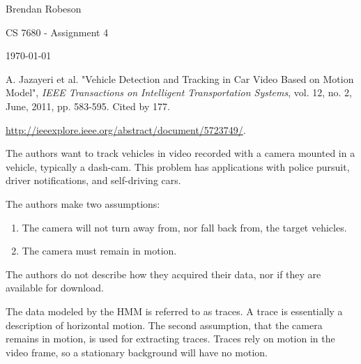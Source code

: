 \documentclass[11pt]{article}
\begin{document}
\noindent Brendan Robeson

\noindent CS 7680 - Assignment 4

\noindent \today

\medskip

\begin{description}[leftmargin=0in]
    \item [Source] A. Jazayeri et al. "Vehicle Detection and Tracking in Car Video Based on Motion
        Model", \emph{IEEE Transactions on Intelligent Transportation Systems}, vol. 12, no. 2,
        June, 2011, pp. 583-595. Cited by 177.

    \item [URL]
        \url{http://ieeexplore.ieee.org/abstract/document/5723749/}.

    \item [Problem] The authors want to track vehicles in video recorded with a camera mounted in a
        vehicle, typically a dash-cam. This problem has applications with police pursuit, driver
        notifications, and self-driving cars.

    \item [Assumptions] The authors make two assumptions:
        \begin{enumerate}
            \item The camera will not turn away from, nor fall back from, the target vehicles.
            \item The camera must remain in motion.
        \end{enumerate}

    \item [Data Sets] The authors do not describe how they acquired their data, nor if they are
        available for download.

    \item [Algorithm Overview]
        The data modeled by the HMM is referred to as traces. A trace is essentially a description
        of horizontal motion. The second assumption, that the camera remains in motion, is used for
        extracting traces. Traces rely on motion in the video frame, so a stationary background will
        have no motion.



\end{description}
\end{document}
